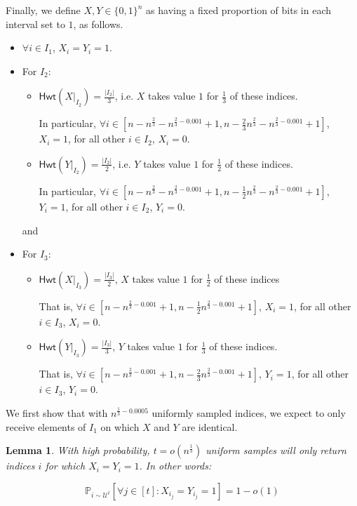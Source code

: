 \documentclass[10pt,a4paper]{article}
\newtheorem{lemma}[theorem]{Lemma}
\newcommand{\Hamming}{\mathsf{Hwt}}
\begin{document}
Finally, we define $X, Y\in\{0,1\}^{n}$ as having a fixed proportion of bits in each interval set to $1$, as follows.
\begin{itemize}
    \item $\forall i\in I_{1}$, $X_{i}=Y_{i}=1$.
    \item For $I_{2}$:
    \begin{itemize}
        \item $\Hamming(X\vert_{I_{2}})=\frac{|I_{2}|}{3}$, i.e. $X$ takes value $1$ for $\frac{1}{3}$ of these indices. 
        
        In particular, $\forall i \in [n-n^{\frac{2}{3}}-n^{\frac{2}{3}-0.001}+1, n-\frac{2}{3}n^{\frac{2}{3}}-n^{\frac{2}{3}-0.001}+1]$, $X_{i}=1$, for all other $i\in I_{2}$, $X_{i}=0$.
        
        \item $\Hamming(Y\vert_{I_{2}})=\frac{|I_{2}|}{2}$, i.e. $Y$ takes value $1$ for $\frac{1}{2}$ of these indices. 
        
        In particular, $\forall i \in [n-n^{\frac{2}{3}}-n^{\frac{2}{3}-0.001}+1, n-\frac{1}{2}n^{\frac{2}{3}}-n^{\frac{2}{3}-0.001}+1]$, $Y_{i}=1$, for all other $i\in I_{2}$, $Y_{i}=0$.
    \end{itemize} and 
    \item For $I_{3}$:
    \begin{itemize}
        \item $\Hamming(X\vert_{I_{3}})=\frac{|I_{3}|}{2}$, $X$ takes value $1$ for $\frac{1}{2}$ of these indices
        
        That is, $\forall i \in [n-n^{\frac{2}{3}-0.001}+1, n-\frac{1}{2}n^{\frac{2}{3}-0.001}+1]$, $X_{i}=1$, for all other $i\in I_{3}$, $X_{i}=0$.
        
        \item $\Hamming(Y\vert_{I_{3}})=\frac{|I_{3}|}{3}$, $Y$ takes value $1$ for $\frac{1}{3}$ of these indices.
        
        That is, $\forall i \in [n-n^{\frac{2}{3}-0.001}+1, n-\frac{2}{3}n^{\frac{2}{3}-0.001}+1]$, $Y_{i}=1$, for all other $i\in I_{3}$, $Y_{i}=0$.
    \end{itemize} 
\end{itemize}

We first show that with $n^{\frac{1}{3}-0.0005}$ uniformly sampled indices, we expect to only receive elements of $I_{1}$ on which $X$ and $Y$ are identical. 
\begin{lemma}\label{usamps}
With high probability, $t = o(n^{\frac{1}{3}})$ uniform samples will only return indices $i$ for which $X_{i}=Y_{i}=1$. In other words:

\begin{equation}
    \mathbb{P}_{i\sim \mathcal{U}^{t}}\left [\forall j\in [t]:X_{i_{j}}=Y_{i_{j}}=1\right ]=1-o(1)
\end{equation}
\end{lemma}
\end{document}
